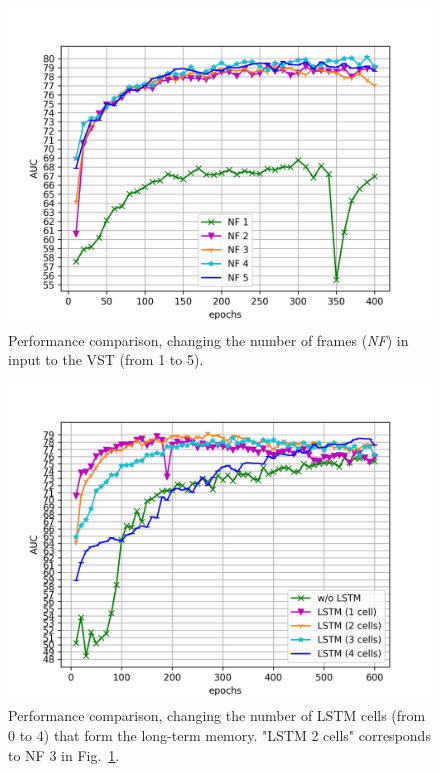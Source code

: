 \begin{figure}[tbh]
\centering
	\includegraphics[trim=0 0 0 0, clip, width=0.8\columnwidth]{images/exp_1.jpg}
	\caption{Performance comparison, changing the number of frames (\emph{NF}) in input to the VST  (from 1 to 5).}
	\label{fig:num-frames-vst}
\end{figure}

\begin{figure}[tbh]
\centering
	\includegraphics[trim=0 0 0 0, clip, width=0.8\columnwidth]{images/exp_2.jpg}
	\caption{Performance comparison, changing the number of LSTM cells (from 0 to 4) that form the long-term memory. "LSTM 2 cells" corresponds to NF 3 in Fig.~\ref{fig:num-frames-vst}.}
	\label{fig:num-memory-cells}
\end{figure}


